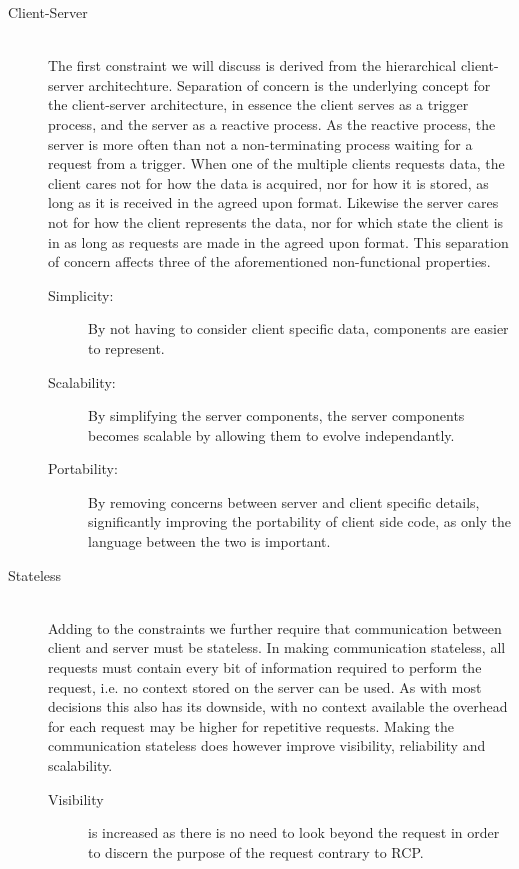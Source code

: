 \begin{description}
    \item [Client-Server\label{client-server-rest}] \hfill \\
    The first constraint we will discuss is derived from the hierarchical client-server architechture.
    Separation of concern is the underlying concept for the client-server architecture, in essence the client serves as a trigger process, and the server as a reactive process.
    As the reactive process, the server is more often than not a non-terminating process waiting for a request from a trigger.
    When one of the multiple clients requests data, the client cares not for how the data is acquired, nor for how it is stored, as long as it is received in the agreed upon format.
    Likewise the server cares not for how the client represents the data, nor for which state the client is in as long as requests are made in the agreed upon format.
    This separation of concern affects three of the aforementioned non-functional properties.
    \begin{description}
        \item[Simplicity:] By not having to consider client specific data, components are easier to represent.
        \item[Scalability:] By simplifying the server components, the server components becomes scalable by allowing them to evolve independantly.
        \item[Portability:] By removing concerns between server and client specific details, significantly improving the portability of client side code, as only the language between the two is important.
    \end{description}
    \item [Stateless] \hfill \\
    Adding to the constraints we further require that communication between client and server must be stateless.
    In making communication stateless, all requests must contain every bit of information required to perform the request, i.e. no context stored on the server can be used.
    As with most decisions this also has its downside, with no context available the overhead for each request may be higher for repetitive requests.
    Making the communication stateless does however improve visibility, reliability and scalability.
    \begin{description}
        \item[Visibility] is increased as there is no need to look beyond the request in order to discern the purpose of the request contrary to RCP.

\end{description}
\end{description}
